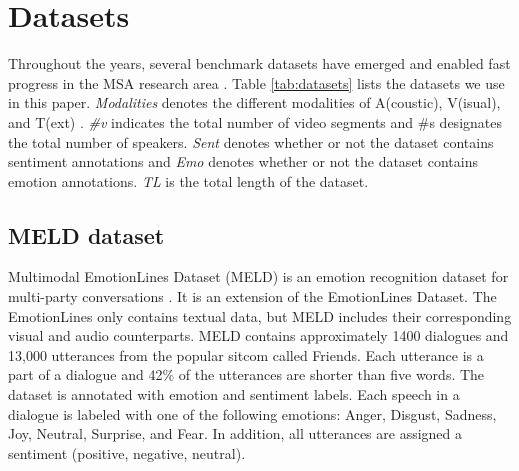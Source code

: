 \section{Datasets}
\label{sec:datasets}
Throughout the years, several benchmark datasets have emerged and enabled fast progress in the MSA research area \cite{COGMEN_joshi-etal-2022-cogmen}.  Table \ref{tab:datasets} lists the datasets we use in this paper. \textit{Modalities} denotes the different modalities of A(coustic), V(isual), and T(ext) \cite{HP_RPP}. \textit{\#v} indicates the total number of video segments and \#s designates the total number of speakers. \textit{Sent} denotes whether or not the dataset contains sentiment annotations and \textit{Emo} denotes whether or not the dataset contains emotion annotations. \textit{TL} is the total length of the dataset. 
%
\begin{table}[h]
\caption{Benchmark MSA datasets}
\centering
{}
\label{tab:datasets}
\end{table}

\subsection{MELD dataset}
Multimodal EmotionLines Dataset (MELD) is an emotion recognition dataset for multi-party conversations \cite{meld_dataset}. It is an extension of the EmotionLines Dataset. The EmotionLines only contains textual data, but MELD includes their corresponding visual and audio counterparts. MELD contains approximately 1400 dialogues and 13,000 utterances from the popular sitcom called Friends. Each utterance is a part of a dialogue and 42\% of the utterances are shorter than five words. The dataset is annotated with emotion and sentiment labels. Each speech in a dialogue is labeled with one of the following emotions: Anger, Disgust, Sadness, Joy, Neutral, Surprise, and Fear. In addition, all utterances are assigned a sentiment (positive, negative, neutral). 

